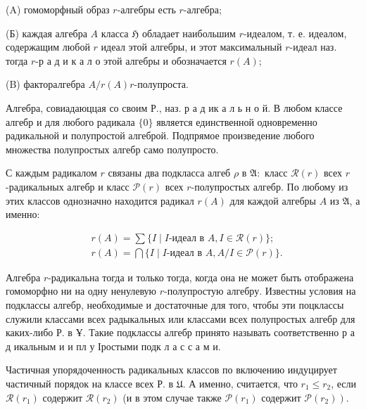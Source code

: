 \documentclass[10pt]{article}
\begin{document}
(A) гомоморфный образ $r$-алгебры есть $r$-алгебра;



(Б) каждая алгебра $A$ класса $\mathfrak{H}$ обладает наибольшим $r$-идеалом, т. е. идеалом, содержащим любой $r$ идеал этой алгебры, и этот максимальный $r$-идеал наз. тогда $r$-р а д и к а л о этой алгебры и обозначается $r(A)$;



(B) факторалгебра $A / r(A) r$-полупроста.



Алгебра, совиадаюццая со своим Р., наз. р а д ик а л ь н о й. В любом классе алгебр и для любого радикала $\{0\}$ является единственной одновременно радикальной и полупростой алгеброй. Подпрямое произведение любого множества полупростых алгебр само полупросто.



С каждым радикалом $r$ связаны два подкласса алгеб $\rho$ в $\mathfrak{A}:$ класс $\mathscr{R}(r)$ всех $r$-радикальных алгебр и класс $\mathscr{P}(r)$ всех $r$-полупростых алгебр. По любому из этих классов однозначно находится радикал $r(A)$ для каждой алгебры $A$ из $\mathfrak{A}$, а именно:



\[

\begin{aligned}

& r(A)=\sum\{I \mid I \text {-идеал в } A, I \in \mathscr{R}(r)\} ; \\

& r(A)=\bigcap\{I \mid I \text {-идеал в } A, A / I \in \mathscr{P}(r)\} .

\end{aligned}

\]



Алгебра $r$-радикальна тогда и только тогда, когда она не может быть отображена гомоморфно ни на одну ненулевую $r$-полупростую алгебру. Известны условия на подклассы алгебр, необходимые и достаточные для того, чтобы эти поцклассы служили классами всех радыкальных или классами всех полупростых алгебр для каких-либо Р. в Ұ. Такие подклассы алгебр принято называть соответственно р а д икальным и и пл у Іростыми подк л а с с а м и.



Частичная упорядоченность радикальных классов по включению индуцирует частичный порядок на классе всех Р. в $\mathfrak{U}$. А именно, считается, что $r_{1} \leqslant r_{2}$, если $\mathscr{R}\left(r_{1}\right)$ содержит $\mathscr{R}\left(r_{2}\right)$ (и в этом случае также $\mathscr{P}\left(r_{1}\right)$ содержит $\left.\mathscr{P}\left(r_{2}\right)\right)$.
\end{document}
